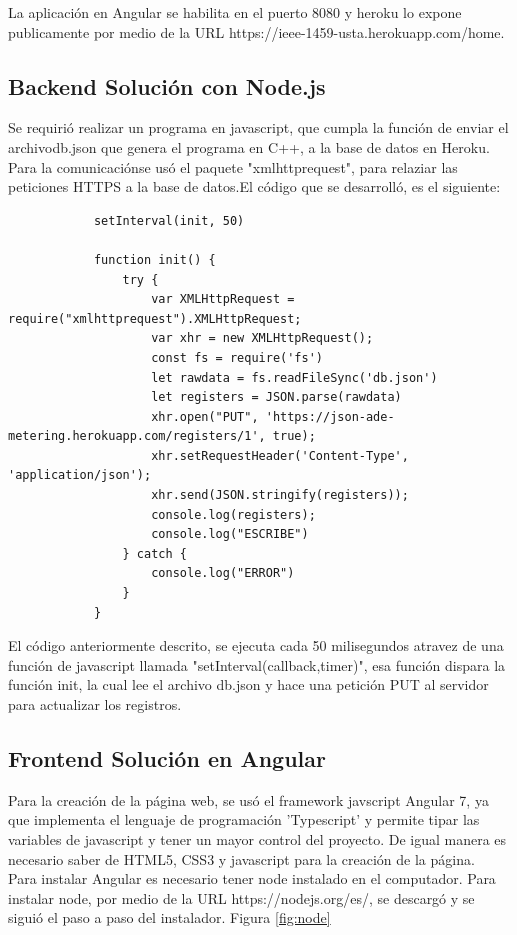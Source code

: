             La aplicación en Angular se habilita en el puerto 8080 y heroku lo expone publicamente por medio de la URL https://ieee-1459-usta.herokuapp.com/home.
    
    \subsection{Backend Solución con Node.js}

    Se requirió realizar un programa en javascript, que cumpla la función de enviar el archivodb.json que genera el programa en C++, a la base de datos en Heroku. Para la comunicaciónse usó el paquete "xmlhttprequest", para relaziar las peticiones HTTPS a la base de datos.El código que se desarrolló, es el siguiente:

        \begin{lstlisting}
            setInterval(init, 50)
        
            function init() {
                try {
                    var XMLHttpRequest = require("xmlhttprequest").XMLHttpRequest;
                    var xhr = new XMLHttpRequest();
                    const fs = require('fs')
                    let rawdata = fs.readFileSync('db.json')
                    let registers = JSON.parse(rawdata)
                    xhr.open("PUT", 'https://json-ade-metering.herokuapp.com/registers/1', true);
                    xhr.setRequestHeader('Content-Type', 'application/json');
                    xhr.send(JSON.stringify(registers));
                    console.log(registers);
                    console.log("ESCRIBE")
                } catch {
                    console.log("ERROR")
                }
            }
        \end{lstlisting}

        El código anteriormente descrito, se ejecuta cada 50 milisegundos atravez de una función de javascript llamada "setInterval(callback,timer)", esa función dispara la función init, la cual lee el archivo db.json y hace una petición PUT al servidor para actualizar los registros.

    \subsection{Frontend Solución en Angular}
        
        Para la creación de la página web, se usó el framework javscript Angular 7, ya que implementa el lenguaje de programación 'Typescript' y permite tipar las variables de javascript y tener un mayor control del proyecto. De igual manera es necesario saber de HTML5, CSS3 y javascript para la creación de la página.\\
        Para instalar Angular es necesario tener node instalado en el computador. Para instalar node, por medio de la URL https://nodejs.org/es/, se descargó y se siguió el paso a paso del instalador. Figura \ref{fig:node} \\

